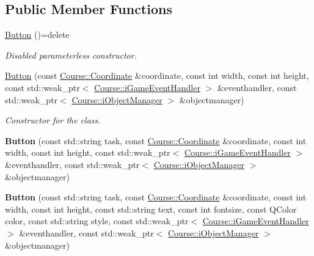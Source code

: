 \subsection*{Public Member Functions}
\begin{DoxyCompactItemize}
\item 
\hypertarget{class_student_1_1_button_a7bdafcf67e4d8b74ab79c25670e8f663}{\hyperlink{class_student_1_1_button_a7bdafcf67e4d8b74ab79c25670e8f663}{Button} ()=delete}\label{class_student_1_1_button_a7bdafcf67e4d8b74ab79c25670e8f663}

\begin{DoxyCompactList}\small\item\em Disabled parameterless constructor. \end{DoxyCompactList}\item 
\hypertarget{class_student_1_1_button_a988a14b4708749500239374e9deac280}{\hyperlink{class_student_1_1_button_a988a14b4708749500239374e9deac280}{Button} (const \hyperlink{class_course_1_1_coordinate}{Course\-::\-Coordinate} \&coordinate, const int width, const int height, const std\-::weak\-\_\-ptr$<$ \hyperlink{class_course_1_1i_game_event_handler}{Course\-::i\-Game\-Event\-Handler} $>$ \&eventhandler, const std\-::weak\-\_\-ptr$<$ \hyperlink{class_course_1_1i_object_manager}{Course\-::i\-Object\-Manager} $>$ \&objectmanager)}\label{class_student_1_1_button_a988a14b4708749500239374e9deac280}

\begin{DoxyCompactList}\small\item\em Constructor for the class. \end{DoxyCompactList}\item 
\hypertarget{class_student_1_1_button_a3d2c87ee7ce6ec4a919b25a158b4b537}{{\bfseries Button} (const std\-::string task, const \hyperlink{class_course_1_1_coordinate}{Course\-::\-Coordinate} \&coordinate, const int width, const int height, const std\-::weak\-\_\-ptr$<$ \hyperlink{class_course_1_1i_game_event_handler}{Course\-::i\-Game\-Event\-Handler} $>$ \&eventhandler, const std\-::weak\-\_\-ptr$<$ \hyperlink{class_course_1_1i_object_manager}{Course\-::i\-Object\-Manager} $>$ \&objectmanager)}\label{class_student_1_1_button_a3d2c87ee7ce6ec4a919b25a158b4b537}

\item 
\hypertarget{class_student_1_1_button_acaaf136f9a8e053f3b4ee42c1d0e8761}{{\bfseries Button} (const std\-::string task, const \hyperlink{class_course_1_1_coordinate}{Course\-::\-Coordinate} \&coordinate, const int width, const int height, const std\-::string text, const int fontsize, const Q\-Color color, const std\-::string style, const std\-::weak\-\_\-ptr$<$ \hyperlink{class_course_1_1i_game_event_handler}{Course\-::i\-Game\-Event\-Handler} $>$ \&eventhandler, const std\-::weak\-\_\-ptr$<$ \hyperlink{class_course_1_1i_object_manager}{Course\-::i\-Object\-Manager} $>$ \&objectmanager)}\label{class_student_1_1_button_acaaf136f9a8e053f3b4ee42c1d0e8761}


\end{DoxyCompactItemize}
